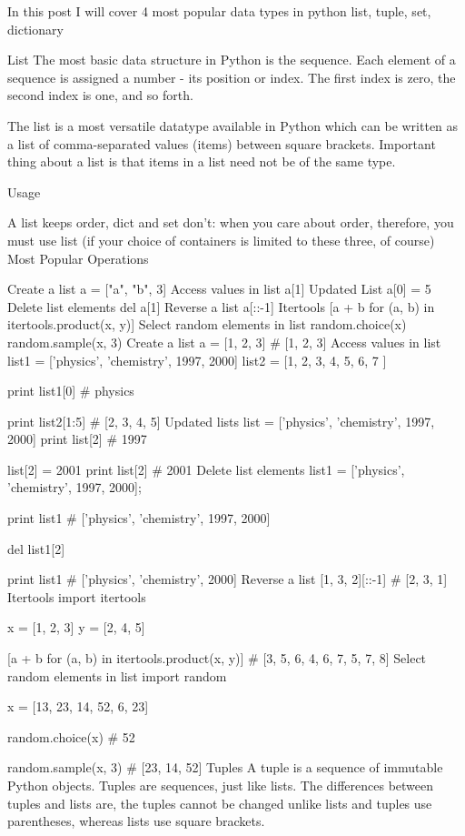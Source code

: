 In this post I will cover 4 most popular data types in python list, tuple, set, dictionary

List
The most basic data structure in Python is the sequence. Each element of a sequence is assigned a number - its position or index. The first index is zero, the second index is one, and so forth.

The list is a most versatile datatype available in Python which can be written as a list of comma-separated values (items) between square brackets. Important thing about a list is that items in a list need not be of the same type.

Usage

A list keeps order, dict and set don't: when you care about order, therefore, you must use list (if your choice of containers is limited to these three, of course)
Most Popular Operations

Create a list
a = ["a", "b", 3]
Access values in list
a[1]
Updated List
a[0] = 5
Delete list elements
del a[1]
Reverse a list
a[::-1]
Itertools
[a + b for (a, b) in itertools.product(x, y)]
Select random elements in list
random.choice(x)
random.sample(x, 3)
Create a list
a = [1, 2, 3]
# [1, 2, 3]
Access values in list
list1 = ['physics', 'chemistry', 1997, 2000]
list2 = [1, 2, 3, 4, 5, 6, 7 ]

print list1[0]   # physics

print list2[1:5] # [2, 3, 4, 5]
Updated lists
list = ['physics', 'chemistry', 1997, 2000]
print list[2] # 1997

list[2] = 2001
print list[2] # 2001
Delete list elements
list1 = ['physics', 'chemistry', 1997, 2000];

print list1
# ['physics', 'chemistry', 1997, 2000]

del list1[2]

print list1
# ['physics', 'chemistry', 2000]
Reverse a list
[1, 3, 2][::-1]
# [2, 3, 1]
Itertools
import itertools

x = [1, 2, 3]
y = [2, 4, 5]

[a + b for (a, b) in itertools.product(x, y)]
# [3, 5, 6, 4, 6, 7, 5, 7, 8]
Select random elements in list
import random

x = [13, 23, 14, 52, 6, 23]

random.choice(x) # 52

random.sample(x, 3) # [23, 14, 52]
Tuples
A tuple is a sequence of immutable Python objects. Tuples are sequences, just like lists. The differences between tuples and lists are, the tuples cannot be changed unlike lists and tuples use parentheses, whereas lists use square brackets.

